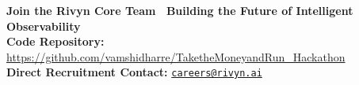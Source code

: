 \documentclass[11pt,a4paper]{article}
\begin{document}
\vspace{12pt}
\begin{center}
    {\large \textbf{\color{rivyncyan}Join the Rivyn Core Team \textbar\ Building the Future of Intelligent Observability}}\\[6pt]
    \textbf{Code Repository:} \url{https://github.com/vamshidharre/TaketheMoneyandRun_Hackathon}\\[2pt]
    \textbf{Direct Recruitment Contact:} \href{mailto:careers@rivyn.ai}{\texttt{careers@rivyn.ai}}
\end{center}
\end{document}
